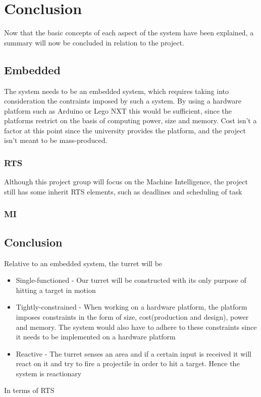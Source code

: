 \section{Conclusion}
Now that the basic concepts of each aspect of the system have been explained, a summary will now be concluded in
relation to the project.
\subsection{Embedded}
The system needs to be an embedded system, which requires taking into consideration the
contraints imposed by such a system. By using a hardware platform such as Arduino or Lego NXT
this would be sufficient, since the platforms restrict on the basis of computing power,
size and memory. Cost isn't a factor at this point since the university provides the platform,
and the project isn't meant to be mass-produced.
\subsubsection{RTS}
Although this project group will focus on the Machine Intelligence, the project still has
some inherit RTS elements, such as deadlines and scheduling of task
\subsubsection{MI}

\subsection{Conclusion}
Relative to an embedded system, the turret will be
\begin{itemize}
  \item Single-functioned - Our turret will be constructed with its only purpose of hitting a target in motion
  \item Tightly-constrained - When working on a hardware platform, the platform imposes constraints in the form of
  size, cost(production and design), power and memory. The system would also have to adhere to these constraints since it
  needs to be implemented on a hardware platform
  \item Reactive - The turret senses an area and if a certain input is received it will react on it and try to fire a projectile
  in order to hit a target. Hence the system is reactionary
\end{itemize}
In terms of RTS

